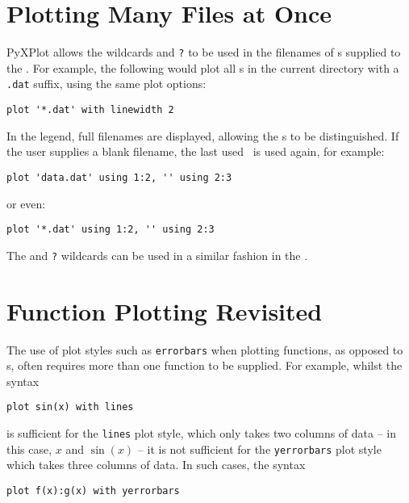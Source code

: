 \section{Plotting Many Files at Once}


PyXPlot allows the wildcards {\tt *} and {\tt ?} to be used in the filenames of
\datafile s supplied to the .  For example, the following would
plot all \datafile s in the current directory with a {\tt .dat} suffix, using
the same plot options:

\begin{verbatim}
plot '*.dat' with linewidth 2
\end{verbatim}

\noindent In the legend, full filenames are displayed, allowing the \datafile s
to be distinguished. If the user supplies a blank filename, the last used
\datafile\ is used again, for example:

\begin{verbatim}
plot 'data.dat' using 1:2, '' using 2:3
\end{verbatim}

\noindent or even:

\begin{verbatim}
plot '*.dat' using 1:2, '' using 2:3
\end{verbatim}

The {\tt *} and {\tt ?} wildcards can be used in a similar fashion in the
.

\section{Function Plotting Revisited}

The use of plot styles such as {\tt errorbars} when plotting functions, as
opposed to \datafile s, often requires more than one function to be supplied.
For example, whilst the syntax

\begin{verbatim}
plot sin(x) with lines
\end{verbatim}

\noindent is sufficient for the {\tt lines} plot style, which only takes two
columns of data -- in this case, $x$ and $\sin(x)$ -- it is not sufficient for
the {\tt yerrorbars} plot style which takes three columns of data. In such
cases, the syntax

\begin{verbatim}
plot f(x):g(x) with yerrorbars
\end{verbatim}

